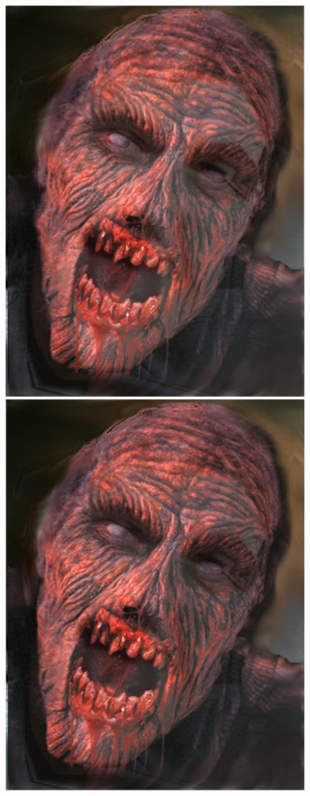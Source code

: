 \documentclass[11pt]{article}
\begin{document}
\begin{figure}[H]
\begin{center}
\includegraphics[scale=0.08]{figs/zombie/zombie_bf_17.jpg} 
\includegraphics[scale=0.08]{figs/zombie/zombie_bf_18.jpg} 

\end{center}
\end{figure}
\end{document}
